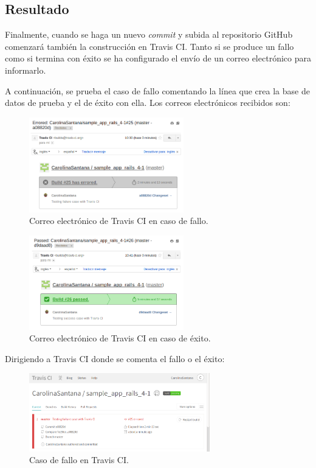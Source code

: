 \subsection{Resultado}

Finalmente, cuando se haga un nuevo \textit{commit} y subida al repositorio GitHub comenzará también la construcción en Travis CI. Tanto si se produce un fallo como si termina con éxito se ha configurado el envío de un correo electrónico para informarlo. 

A continuación, se prueba el caso de fallo comentando la línea que crea la base de datos de prueba  y el de éxito con ella. Los correos electrónicos recibidos son:

\begin{figure}[H]
\centering
\includegraphics[width=0.6\textwidth]{images/figures/travisfailure.png}
\caption{Correo electrónico de Travis CI en caso de fallo.}
\end{figure}

\begin{figure}[H]
\centering
\includegraphics[width=0.6\textwidth]{images/figures/travissuccess.png}
\caption{Correo electrónico de Travis CI en caso de éxito.}
\end{figure}

Dirigiendo a Travis CI donde se comenta el fallo o el éxito:

\begin{figure}[H]
\centering
\includegraphics[width=0.7\textwidth]{images/figures/travisfailure2.png}
\caption{Caso de fallo en Travis CI.}
\end{figure}

